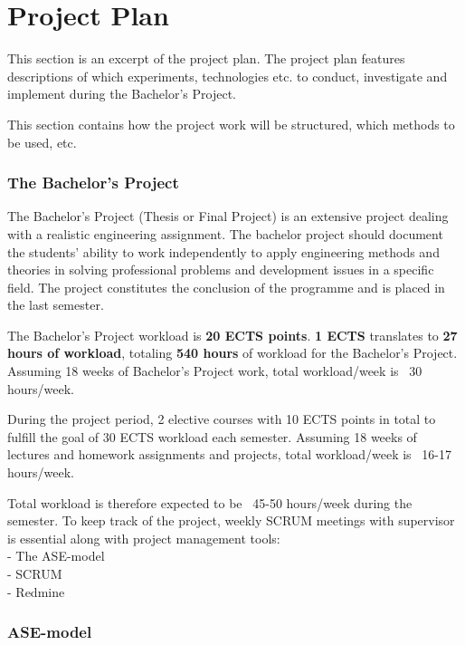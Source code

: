\chapter{Project Plan}
This section is an excerpt of the project plan. The project plan features descriptions of which experiments, technologies etc. to conduct, investigate and implement during the Bachelor's Project. \newline

This section contains how the project work will be structured, which methods to be used, etc. \newline

\subsection{The Bachelor's Project}
The Bachelor’s Project (Thesis or Final Project) is an extensive project dealing with a realistic engineering assignment. The bachelor project should document the students’ ability to work independently to apply engineering methods and theories in solving professional problems and development issues in a specific field. The project constitutes the conclusion of the programme and is placed in the last semester. \newline

The Bachelor's Project workload is \textbf{20 ECTS points}. \textbf{1 ECTS} translates to \textbf{27 hours of workload}, totaling \textbf{540 hours} of workload for the Bachelor's Project. Assuming 18 weeks of Bachelor's Project work, total workload/week is ~30 hours/week. \newline

During the project period, 2 elective courses with 10 ECTS points in total to fulfill the goal of 30 ECTS workload each semester. Assuming 18 weeks of lectures and homework assignments and projects, total workload/week is ~16-17 hours/week. \newline

Total workload is therefore expected to be ~45-50 hours/week during the semester. To keep track of the project, weekly SCRUM meetings with supervisor is essential along with project management tools: \\

- The ASE-model \\
- SCRUM \\
- Redmine \newline

\subsection{ASE-model}

